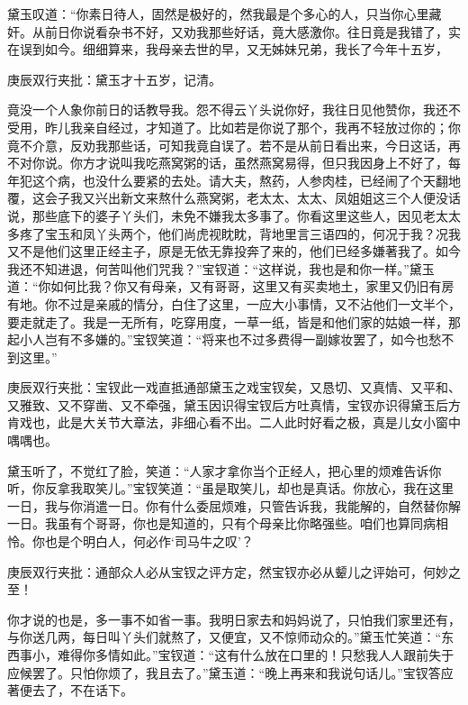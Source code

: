 \begin{parag}


    黛玉叹道：“你素日待人，固然是极好的，然我最是个多心的人，只当你心里藏奸。从前日你说看杂书不好，又劝我那些好话，竟大感激你。往日竟是我错了，实在误到如今。细细算来，我母亲去世的早，又无姊妹兄弟，我长了今年十五岁，\begin{note}庚辰双行夹批：黛玉才十五岁，记清。\end{note}竟没一个人象你前日的话教导我。怨不得云丫头说你好，我往日见他赞你，我还不受用，昨儿我亲自经过，才知道了。比如若是你说了那个，我再不轻放过你的；你竟不介意，反劝我那些话，可知我竟自误了。若不是从前日看出来，今日这话，再不对你说。你方才说叫我吃燕窝粥的话，虽然燕窝易得，但只我因身上不好了，每年犯这个病，也没什么要紧的去处。请大夫，熬药，人参肉桂，已经闹了个天翻地覆，这会子我又兴出新文来熬什么燕窝粥，老太太、太太、凤姐姐这三个人便没话说，那些底下的婆子丫头们，未免不嫌我太多事了。你看这里这些人，因见老太太多疼了宝玉和凤丫头两个，他们尚虎视眈眈，背地里言三语四的，何况于我？况我又不是他们这里正经主子，原是无依无靠投奔了来的，他们已经多嫌著我了。如今我还不知进退，何苦叫他们咒我？”宝钗道：“这样说，我也是和你一样。”黛玉道：“你如何比我？你又有母亲，又有哥哥，这里又有买卖地土，家里又仍旧有房有地。你不过是亲戚的情分，白住了这里，一应大小事情，又不沾他们一文半个，要走就走了。我是一无所有，吃穿用度，一草一纸，皆是和他们家的姑娘一样，那起小人岂有不多嫌的。”宝钗笑道：“将来也不过多费得一副嫁妆罢了，如今也愁不到这里。”\begin{note}庚辰双行夹批：宝钗此一戏直抵通部黛玉之戏宝钗矣，又恳切、又真情、又平和、又雅致、又不穿凿、又不牵强，黛玉因识得宝钗后方吐真情，宝钗亦识得黛玉后方肯戏也，此是大关节大章法，非细心看不出。二人此时好看之极，真是儿女小窗中喁喁也。\end{note}黛玉听了，不觉红了脸，笑道：“人家才拿你当个正经人，把心里的烦难告诉你听，你反拿我取笑儿。”宝钗笑道：“虽是取笑儿，却也是真话。你放心，我在这里一日，我与你消遣一日。你有什么委屈烦难，只管告诉我，我能解的，自然替你解一日。我虽有个哥哥，你也是知道的，只有个母亲比你略强些。咱们也算同病相怜。你也是个明白人，何必作‘司马牛之叹’？\begin{note}庚辰双行夹批：通部众人必从宝钗之评方定，然宝钗亦必从颦儿之评始可，何妙之至！\end{note}你才说的也是，多一事不如省一事。我明日家去和妈妈说了，只怕我们家里还有，与你送几两，每日叫丫头们就熬了，又便宜，又不惊师动众的。”黛玉忙笑道：“东西事小，难得你多情如此。”宝钗道：“这有什么放在口里的！只愁我人人跟前失于应候罢了。只怕你烦了，我且去了。”黛玉道：“晚上再来和我说句话儿。”宝钗答应著便去了，不在话下。
\end{parag}


